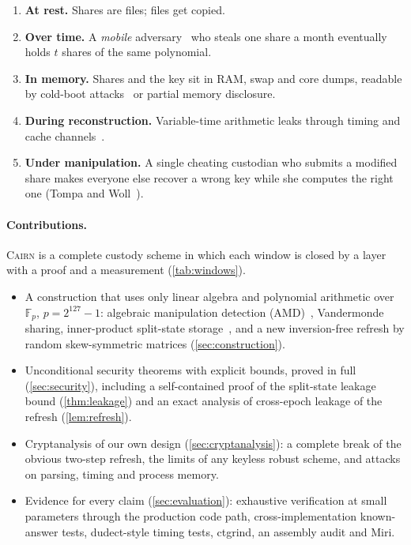 \documentclass[10.5pt,a4paper]{article}
\theoremstyle{plain}
\theoremstyle{definition}
\newcommand{\Fp}{\mathbb{F}_p}
\newcommand{\cairn}{\textsc{Cairn}}
\begin{document}
\begin{enumerate}[leftmargin=*,label=\textbf{W\arabic*.},itemsep=1pt]
\item \textbf{At rest.} Shares are files; files get copied.
\item \textbf{Over time.} A \emph{mobile} adversary~\cite{ostrovsky91} who steals one share a month eventually holds $t$ shares of the same polynomial.
\item \textbf{In memory.} Shares and the key sit in RAM, swap and core dumps, readable by cold-boot attacks~\cite{halderman08} or partial memory disclosure.
\item \textbf{During reconstruction.} Variable-time arithmetic leaks through timing and cache channels~\cite{kocher96}.
\item \textbf{Under manipulation.} A single cheating custodian who submits a modified share makes everyone else recover a wrong key while she computes the right one (Tompa and Woll~\cite{tompa88}).
\end{enumerate}

\paragraph{Contributions.} \cairn{} is a complete custody scheme in which each window is closed by a layer with a proof and a measurement (\cref{tab:windows}).
\begin{itemize}[leftmargin=*,itemsep=1pt]
\item A construction that uses only linear algebra and polynomial arithmetic over $\Fp$, $p=2^{127}-1$: algebraic manipulation detection (AMD)~\cite{cramer08}, Vandermonde sharing, inner-product split-state storage~\cite{davi10,dziembowski11}, and a new inversion-free refresh by random skew-symmetric matrices (\cref{sec:construction}).
\item Unconditional security theorems with explicit bounds, proved in full (\cref{sec:security}), including a self-contained proof of the split-state leakage bound (\cref{thm:leakage}) and an exact analysis of cross-epoch leakage of the refresh (\cref{lem:refresh}).
\item Cryptanalysis of our own design (\cref{sec:cryptanalysis}): a complete break of the obvious two-step refresh, the limits of any keyless robust scheme, and attacks on parsing, timing and process memory.
\item Evidence for every claim (\cref{sec:evaluation}): exhaustive verification at small parameters through the production code path, cross-implementation known-answer tests, dudect-style timing tests, ctgrind, an assembly audit and Miri.
\end{itemize}
\end{document}
